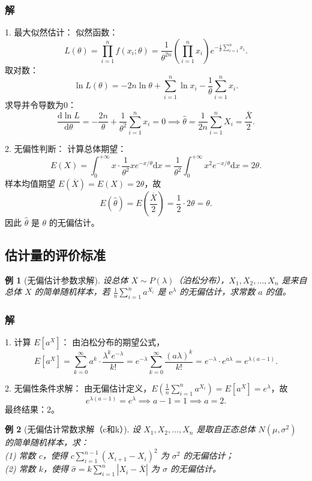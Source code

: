 \documentclass{book}
\newtheorem{example}{例}[subsection]
\begin{document}
\subsubsection{解}
1. 最大似然估计：
似然函数：
\[
L(\theta) = \prod_{i=1}^n f(x_i;\theta) = \frac{1}{\theta^{2n}} \left(\prod_{i=1}^n x_i\right) e^{-\frac{1}{\theta}\sum_{i=1}^n x_i}.
\]
取对数：
\[
\ln L(\theta) = -2n\ln\theta + \sum_{i=1}^n \ln x_i - \frac{1}{\theta} \sum_{i=1}^n x_i.
\]
求导并令导数为0：
\[
\frac{\mathrm{d}\ln L}{\mathrm{d}\theta} = -\frac{2n}{\theta} + \frac{1}{\theta^2} \sum_{i=1}^n x_i = 0 \implies \hat\theta = \frac{1}{2n} \sum_{i=1}^n X_i = \frac{\overline{X}}{2}.
\]

2. 无偏性判断：
计算总体期望：
\[
E(X) = \int_{0}^{+\infty} x \cdot \frac{1}{\theta^2} x e^{-x/\theta} \mathrm{d}x = \frac{1}{\theta^2} \int_{0}^{+\infty} x^2 e^{-x/\theta} \mathrm{d}x = 2\theta.
\]
样本均值期望 $E(\overline{X}) = E(X) = 2\theta$，故
\[
E(\hat\theta) = E\left(\frac{\overline{X}}{2}\right) = \frac{1}{2} \cdot 2\theta = \theta.
\]
因此 $\hat\theta$ 是 $\theta$ 的无偏估计。

\subsection{估计量的评价标准}

\begin{example}[无偏估计参数求解]
设总体 $X \sim P(\lambda)$（泊松分布），$X_1,X_2,\dots,X_n$ 是来自总体 $X$ 的简单随机样本，若 $\frac{1}{n}\sum_{i=1}^n a^{X_i}$ 是 $\mathrm{e}^{\lambda}$ 的无偏估计，求常数 $a$ 的值。
\end{example}

\subsubsection{解}
1. 计算 $E[a^X]$：
由泊松分布的期望公式，
\[
E[a^X] = \sum_{k=0}^{\infty} a^k \cdot \frac{\lambda^k e^{-\lambda}}{k!} = e^{-\lambda} \sum_{k=0}^{\infty} \frac{(a\lambda)^k}{k!} = e^{-\lambda} \cdot e^{a\lambda} = e^{\lambda(a-1)}.
\]

2. 无偏性条件求解：
由无偏估计定义，$E\left(\frac{1}{n}\sum_{i=1}^n a^{X_i}\right) = E[a^X] = e^{\lambda}$，故
\[
e^{\lambda(a-1)} = e^{\lambda} \implies a-1 = 1 \implies a = 2.
\]
最终结果：$\boxed{2}$。

\begin{example}[无偏估计常数求解（c和k）]
设 $X_1,X_2,\dots,X_n$ 是取自正态总体 $N(\mu,\sigma^2)$ 的简单随机样本，求：\\
(1) 常数 $c$，使得 $c\sum_{i=1}^{n-1} (X_{i+1}-X_i)^2$ 为 $\sigma^2$ 的无偏估计；\\
(2) 常数 $k$，使得 $\hat{\sigma} = k\sum_{i=1}^n |X_i - \overline{X}|$ 为 $\sigma$ 的无偏估计。
\end{example}
\end{document}
